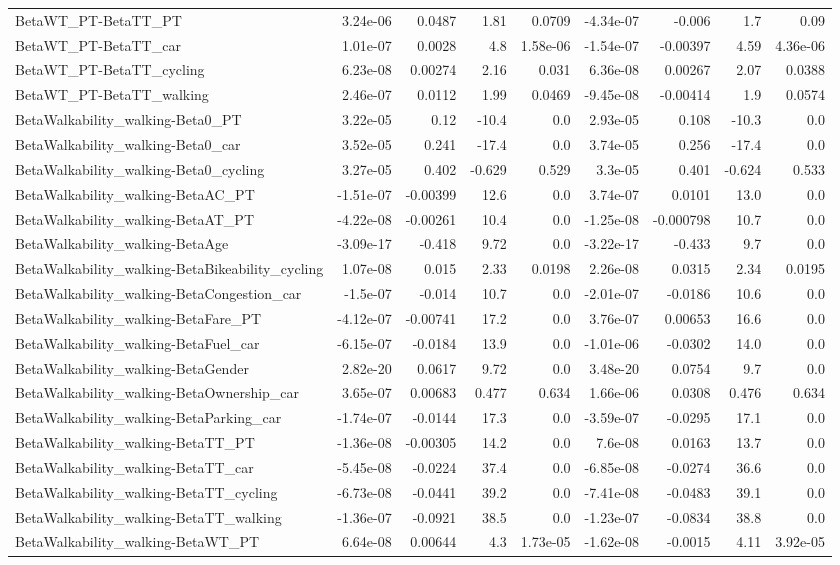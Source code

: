 \begin{tabular}{lrrrrrrrr}
BetaWT_PT-BetaTT_PT & 3.24e-06 & 0.0487 & 1.81 & 0.0709 & -4.34e-07 & -0.006 & 1.7 & 0.09 \\
BetaWT_PT-BetaTT_car & 1.01e-07 & 0.0028 & 4.8 & 1.58e-06 & -1.54e-07 & -0.00397 & 4.59 & 4.36e-06 \\
BetaWT_PT-BetaTT_cycling & 6.23e-08 & 0.00274 & 2.16 & 0.031 & 6.36e-08 & 0.00267 & 2.07 & 0.0388 \\
BetaWT_PT-BetaTT_walking & 2.46e-07 & 0.0112 & 1.99 & 0.0469 & -9.45e-08 & -0.00414 & 1.9 & 0.0574 \\
BetaWalkability_walking-Beta0_PT & 3.22e-05 & 0.12 & -10.4 & 0.0 & 2.93e-05 & 0.108 & -10.3 & 0.0 \\
BetaWalkability_walking-Beta0_car & 3.52e-05 & 0.241 & -17.4 & 0.0 & 3.74e-05 & 0.256 & -17.4 & 0.0 \\
BetaWalkability_walking-Beta0_cycling & 3.27e-05 & 0.402 & -0.629 & 0.529 & 3.3e-05 & 0.401 & -0.624 & 0.533 \\
BetaWalkability_walking-BetaAC_PT & -1.51e-07 & -0.00399 & 12.6 & 0.0 & 3.74e-07 & 0.0101 & 13.0 & 0.0 \\
BetaWalkability_walking-BetaAT_PT & -4.22e-08 & -0.00261 & 10.4 & 0.0 & -1.25e-08 & -0.000798 & 10.7 & 0.0 \\
BetaWalkability_walking-BetaAge & -3.09e-17 & -0.418 & 9.72 & 0.0 & -3.22e-17 & -0.433 & 9.7 & 0.0 \\
BetaWalkability_walking-BetaBikeability_cycling & 1.07e-08 & 0.015 & 2.33 & 0.0198 & 2.26e-08 & 0.0315 & 2.34 & 0.0195 \\
BetaWalkability_walking-BetaCongestion_car & -1.5e-07 & -0.014 & 10.7 & 0.0 & -2.01e-07 & -0.0186 & 10.6 & 0.0 \\
BetaWalkability_walking-BetaFare_PT & -4.12e-07 & -0.00741 & 17.2 & 0.0 & 3.76e-07 & 0.00653 & 16.6 & 0.0 \\
BetaWalkability_walking-BetaFuel_car & -6.15e-07 & -0.0184 & 13.9 & 0.0 & -1.01e-06 & -0.0302 & 14.0 & 0.0 \\
BetaWalkability_walking-BetaGender & 2.82e-20 & 0.0617 & 9.72 & 0.0 & 3.48e-20 & 0.0754 & 9.7 & 0.0 \\
BetaWalkability_walking-BetaOwnership_car & 3.65e-07 & 0.00683 & 0.477 & 0.634 & 1.66e-06 & 0.0308 & 0.476 & 0.634 \\
BetaWalkability_walking-BetaParking_car & -1.74e-07 & -0.0144 & 17.3 & 0.0 & -3.59e-07 & -0.0295 & 17.1 & 0.0 \\
BetaWalkability_walking-BetaTT_PT & -1.36e-08 & -0.00305 & 14.2 & 0.0 & 7.6e-08 & 0.0163 & 13.7 & 0.0 \\
BetaWalkability_walking-BetaTT_car & -5.45e-08 & -0.0224 & 37.4 & 0.0 & -6.85e-08 & -0.0274 & 36.6 & 0.0 \\
BetaWalkability_walking-BetaTT_cycling & -6.73e-08 & -0.0441 & 39.2 & 0.0 & -7.41e-08 & -0.0483 & 39.1 & 0.0 \\
BetaWalkability_walking-BetaTT_walking & -1.36e-07 & -0.0921 & 38.5 & 0.0 & -1.23e-07 & -0.0834 & 38.8 & 0.0 \\
BetaWalkability_walking-BetaWT_PT & 6.64e-08 & 0.00644 & 4.3 & 1.73e-05 & -1.62e-08 & -0.0015 & 4.11 & 3.92e-05 \\
\end{tabular}
